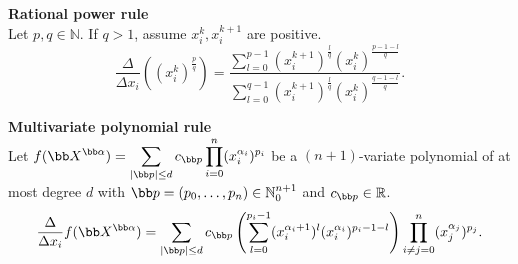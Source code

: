 \item {\bf Rational power rule} \label{rule:rationalPower}\\
Let $p,q\in \mathbb{N}$. If $q>1$, assume $x_i^k, x_i^{k+1}$ are positive.
\begin{equation*}
\frac{\Delta}{\Delta x_i}\left((x^{k}_i)^\frac{p}{q}\right) = 
\frac{\sum_{l=0}^{p-1} (x^{k+1}_i)^{\frac{l}{q}} (x^{k}_i)^{\frac{p-1-l}{q}}}{\sum_{l=0}^{q-1} (x^{k+1}_i)^\frac{l}{q} (x^{k}_i)^\frac{q-1-l}{q}}.
\end{equation*}

\item {\bf Multivariate polynomial rule} \label{rule:polynomial}\\
Let $\displaystyle f(\bb X^{\bb \alpha})=\sum_{|\bb p|\leq d} c_{\bb p} \prod_{i=0}^n (x_i^{\alpha_i})^{p_i}$ be a $(n+1)$-variate polynomial of at most degree $d$ with $\bb p=(p_0,\dots, p_n)\in\mathbb{N}_0^{n+1}$ and $c_{\bb p} \in \mathbb{R}$.
\[
\frac{\Delta}{\Delta x_i} f(\bb X^{\bb \alpha}) = \sum_{|\bb p|\leq d} c_{\bb p}  \left(\sum_{l=0}^{p_i-1} (x^{\alpha_i+1}_i)^l (x^{\alpha_i}_i)^{p_i-1-l}\right) \prod_{i\neq j=0}^n (x_j^{\alpha_j})^{p_j}.
\]
